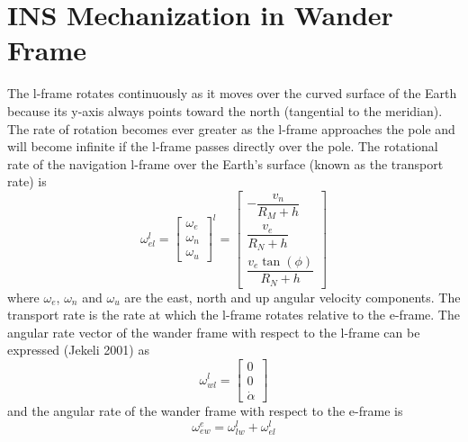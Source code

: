 \section{INS Mechanization in Wander Frame}
The l-frame rotates continuously as it moves over the curved surface of the Earth because its y-axis always points toward the north (tangential to the meridian).
The rate of rotation becomes ever greater as the l-frame approaches the pole and will become infinite if the l-frame passes directly over the pole.
The rotational rate of the navigation l-frame over the Earth’s surface (known as the transport rate) is
\begin{equation}
    \omega_{el}^l = \begin{bmatrix}
        \omega_e \\
        \omega_n \\
        \omega_u
    \end{bmatrix}^l = \begin{bmatrix}
        -\dfrac{v_n}{R_M + h} \\[1em]
        \dfrac{v_e}{R_N + h} \\[1em]
        \dfrac{v_e\tan(\phi)}{R_N + h}
    \end{bmatrix}
\end{equation}
where $\omega_e$, $\omega_n$ and $\omega_u$ are the east, north and up angular velocity components.
The transport rate is the rate at which the l-frame rotates relative to the e-frame.
The angular rate vector of the wander frame with respect to the l-frame can be expressed (Jekeli 2001) as
\begin{equation}
    \omega_{wl}^l = \begin{bmatrix}
        0\\
        0\\
        \dot \alpha
    \end{bmatrix}
\end{equation}
and the angular rate of the wander frame with respect to the e-frame is
\begin{equation}
    \omega_{ew}^e = \omega_{lw}^l + \omega_{el}^l
\end{equation}

